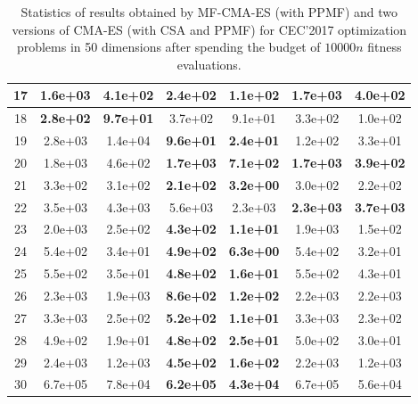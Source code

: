 \begin{table}[t!]
{\begin{tabular}{c|c|c|c|c|c|c}
17 & 1.6e+03 & 4.1e+02 & \textbf{2.4e+02} & \textbf{1.1e+02} & 1.7e+03 & 4.0e+02\\
\hline
18 & \textbf{2.8e+02} & \textbf{9.7e+01} & 3.7e+02 & 9.1e+01 & 3.3e+02 & 1.0e+02\\
\hline
19 & 2.8e+03 & 1.4e+04 & \textbf{9.6e+01} & \textbf{2.4e+01} & 1.2e+02 & 3.3e+01\\
\hline
20 & 1.8e+03 & 4.6e+02 & \textbf{1.7e+03} & \textbf{7.1e+02} & \textbf{1.7e+03} & \textbf{3.9e+02}\\
\hline
21 & 3.3e+02 & 3.1e+02 & \textbf{2.1e+02} & \textbf{3.2e+00} & 3.0e+02 & 2.2e+02\\
\hline
22 & 3.5e+03 & 4.3e+03 & 5.6e+03 & 2.3e+03 & \textbf{2.3e+03} & \textbf{3.7e+03}\\
\hline
23 & 2.0e+03 & 2.5e+02 & \textbf{4.3e+02} & \textbf{1.1e+01} & 1.9e+03 & 1.5e+02\\
\hline
24 & 5.4e+02 & 3.4e+01 & \textbf{4.9e+02} & \textbf{6.3e+00} & 5.4e+02 & 3.2e+01\\
\hline
25 & 5.5e+02 & 3.5e+01 & \textbf{4.8e+02} & \textbf{1.6e+01} & 5.5e+02 & 4.3e+01\\
\hline
26 & 2.3e+03 & 1.9e+03 & \textbf{8.6e+02} & \textbf{1.2e+02} & 2.2e+03 & 2.2e+03\\
\hline
27 & 3.3e+03 & 2.5e+02 & \textbf{5.2e+02} & \textbf{1.1e+01} & 3.3e+03 & 2.3e+02\\
\hline
28 & 4.9e+02 & 1.9e+01 & \textbf{4.8e+02} & \textbf{2.5e+01} & 5.0e+02 & 3.0e+01\\
\hline
29 & 2.4e+03 & 1.2e+03 & \textbf{4.5e+02} & \textbf{1.6e+02} & 2.2e+03 & 1.2e+03\\
\hline
30 & 6.7e+05 & 7.8e+04 & \textbf{6.2e+05} & \textbf{4.3e+04} & 6.7e+05 & 5.6e+04\\
\bottomrule
\end{tabular}
}
\caption{Statistics of results obtained by MF-CMA-ES (with PPMF) and two versions of CMA-ES (with CSA and PPMF) for CEC'2017 optimization problems in 50 dimensions after spending the budget of $10000n$ fitness evaluations.}
\label{tab:CEC17-D50}
\end{table}